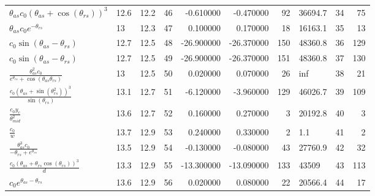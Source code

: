 \begin{tabularx}{\textwidth}{lllrrrrlrr}
$ \theta_{as} c_{0} \left(\theta_{as} + \cos{\left(\theta_{rs} \right)}\right)^{3} $  &  12.6  &  12.2  &  46  &  -0.610000  &  -0.470000  &  92  &  36694.7  &  34\phantom{.000000}  &  75\phantom{.000000}  \\ 
$ \theta_{as} c_{0} e^{- \theta_{rs}} $  &  13\phantom{.0}  &  12.3  &  47  &  0.100000  &  0.170000  &  18  &  16163.1  &  35\phantom{.000000}  &  13\phantom{.000000}  \\ 
$ c_{0} \sin{\left(\theta_{as} - \theta_{rs} \right)} $  &  12.7  &  12.5  &  48  &  -26.900000  &  -26.370000  &  150  &  48360.8  &  36\phantom{.000000}  &  129\phantom{.000000}  \\ 
$ c_{0} \sin{\left(\theta_{as} - \theta_{rs} \right)} $  &  12.7  &  12.5  &  49  &  -26.900000  &  -26.370000  &  151  &  48360.8  &  37\phantom{.000000}  &  130\phantom{.000000}  \\ 
$ \displaystyle\frac{\theta_{as}^{2} c_{0}}{e^{\theta_{rs}} + \cos{\left(\theta_{as} \theta_{rs} \right)}} $  &  13\phantom{.0}  &  12.5  &  50  &  0.020000  &  0.070000  &  26  &  inf  &  38\phantom{.000000}  &  21\phantom{.000000}  \\ 
$ \displaystyle\frac{c_{0} \left(\theta_{as} + \sin{\left(\theta_{rs}^{2} \right)}\right)^{3}}{\sin{\left(\theta_{rs} \right)}} $  &  13.1  &  12.7  &  51  &  -6.120000  &  -3.960000  &  129  &  46026.7  &  39\phantom{.000000}  &  109\phantom{.000000}  \\ 
$ \displaystyle\frac{c_{0} y_c}{\theta_{mid}^{2}} $  &  13.6  &  12.7  &  52  &  0.160000  &  0.270000  &  3  &  20192.8  &  40\phantom{.000000}  &  3\phantom{.000000}  \\ 
$ \displaystyle\frac{c_{0}}{w} $  &  13.7  &  12.9  &  53  &  0.240000  &  0.330000  &  2  &  1.1  &  41\phantom{.000000}  &  2\phantom{.000000}  \\ 
$ \displaystyle\frac{\theta_{as}^{3} c_{0}}{- \theta_{rs} + e^{\theta_{rs}}} $  &  13.5  &  12.9  &  54  &  -0.130000  &  -0.080000  &  43  &  27760.9  &  42\phantom{.000000}  &  32\phantom{.000000}  \\ 
$ \displaystyle\frac{c_{0} \left(\theta_{as} + \theta_{rs} \cos{\left(\theta_{rs} \right)}\right)^{3}}{d} $  &  13.3  &  12.9  &  55  &  -13.300000  &  -13.090000  &  133  &  43509\phantom{.0}  &  43\phantom{.000000}  &  113\phantom{.000000}  \\ 
$ c_{0} e^{\theta_{as} - \theta_{rs}} $  &  13.6  &  12.9  &  56  &  0.020000  &  0.080000  &  22  &  20566.4  &  44\phantom{.000000}  &  17\phantom{.000000}  \\ 

\end{tabularx}
